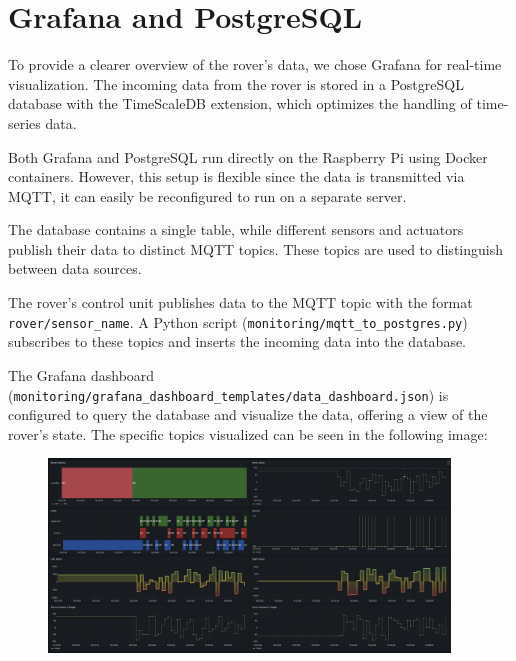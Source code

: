 \section{Grafana and PostgreSQL}

To provide a clearer overview of the rover's data, we chose Grafana for real-time visualization.
The incoming data from the rover is stored in a PostgreSQL database with the TimeScaleDB extension, which optimizes the handling of time-series data.

Both Grafana and PostgreSQL run directly on the Raspberry Pi using Docker containers.
However, this setup is flexible since the data is transmitted via MQTT, it can easily be reconfigured to run on a separate server.

The database contains a single table, while different sensors and actuators publish their data to distinct MQTT topics. These topics are used to distinguish between data sources.

The rover’s control unit publishes data to the MQTT topic with the format \texttt{rover/sensor\_name}.
A Python script (\texttt{monitoring/mqtt\_to\_postgres.py}) subscribes to these topics and inserts the incoming data into the database.

The Grafana dashboard (\texttt{monitoring/grafana\_dashboard\_templates/data\_dashboard.json}) is configured to query the database and visualize the data, offering a view of the rover’s state.
The specific topics visualized can be seen in the following image:

\begin{figure}[H]
    \centering
    \includegraphics[width=0.95\textwidth]{img/grafana_dashboard}
\end{figure}

